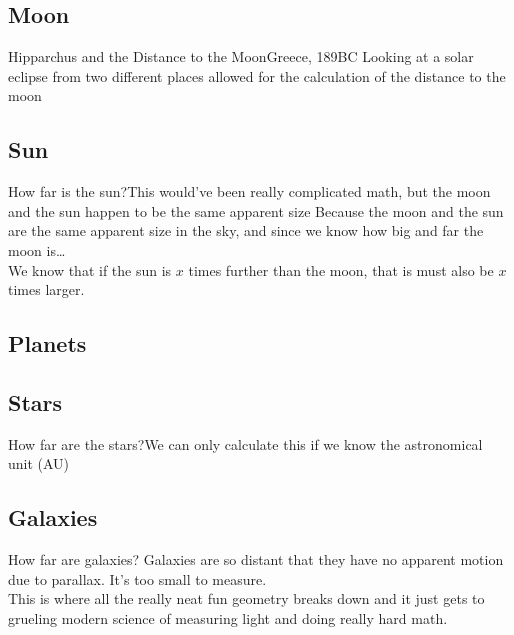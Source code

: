 \documentclass[12pt]{beamer}
\begin{document}
    \subsection{Moon}
        \begin{frame}{Hipparchus and the Distance to the Moon}{Greece, 189BC} \centering
            Looking at a solar eclipse from two different places allowed for the calculation of the distance to the moon
        \end{frame}
    \subsection{Sun}
        \begin{frame}{How far is the sun?}{This would've been really complicated math, but the moon and the sun happen to be the same apparent size} \centering
            Because the moon and the sun are the same apparent size in the sky, and since we know how big and far the moon is\ldots\\
            We know that if the sun is $x$ times further than the moon, that is must also be $x$ times larger.\\
        \end{frame}
    \subsection{Planets}
    \subsection{Stars}
        \begin{frame}{How far are the stars?}{We can only calculate this if we know the astronomical unit (AU)}
        \end{frame}
    \subsection{Galaxies}
        \begin{frame}{How far are galaxies?} \centering
            Galaxies are so distant that they have no apparent motion due to parallax. It's too small to measure.\\

            This is where all the really neat fun geometry breaks down and it just gets to grueling modern science of measuring light and doing really hard math.

        \end{frame}
\end{document}
